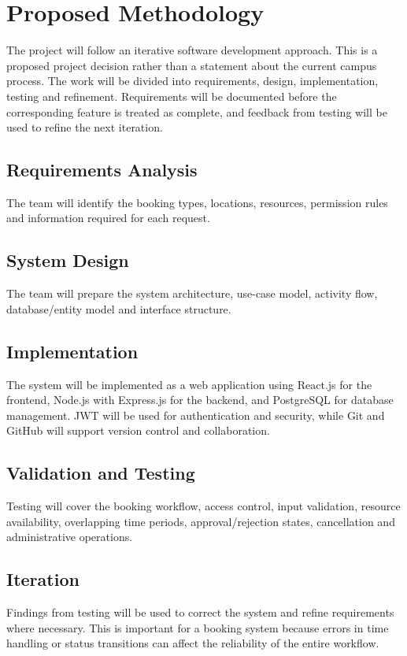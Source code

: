 \documentclass[12pt]{article}
\begin{document}
\section{Proposed Methodology}
The project will follow an iterative software development approach. This is a proposed project decision rather than a statement about the current campus process. The work will be divided into requirements, design, implementation, testing and refinement. Requirements will be documented before the corresponding feature is treated as complete, and feedback from testing will be used to refine the next iteration.

\subsection{Requirements Analysis}
The team will identify the booking types, locations, resources, permission rules and information required for each request.

\subsection{System Design}
The team will prepare the system architecture, use-case model, activity flow, database/entity model and interface structure.

\subsection{Implementation}
The system will be implemented as a web application using React.js for the frontend, Node.js with Express.js for the backend, and PostgreSQL for database management. JWT will be used for authentication and security, while Git and GitHub will support version control and collaboration.

\subsection{Validation and Testing}
Testing will cover the booking workflow, access control, input validation, resource availability, overlapping time periods, approval/rejection states, cancellation and administrative operations.

\subsection{Iteration}
Findings from testing will be used to correct the system and refine requirements where necessary. This is important for a booking system because errors in time handling or status transitions can affect the reliability of the entire workflow.
\end{document}
